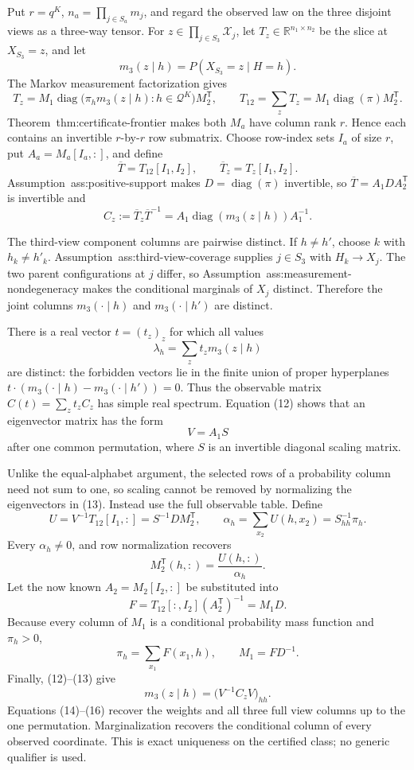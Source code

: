 Put \(r=q^K\), \(n_a=\prod_{j\in S_a}m_j\), and regard the observed law on the three disjoint views as a three-way tensor.  For \(z\in\prod_{j\in S_3}\mathcal X_j\), let \(T_z\in\mathbb R^{n_1\times n_2}\) be the slice at \(X_{S_3}=z\), and let
\[
 m_3(z\mid h)=P(X_{S_3}=z\mid H=h).
\]
The Markov measurement factorization gives
\[
 T_z=M_1\operatorname{diag}
 \bigl(\pi_hm_3(z\mid h):h\in\mathcal Q^K\bigr)M_2^{\mathsf T},
 \qquad
 T_{12}=\sum_zT_z=M_1\operatorname{diag}(\pi)M_2^{\mathsf T}.
\tag{11}
\]
Theorem~\textnormal{thm:certificate-frontier} makes both \(M_a\) have column rank \(r\).  Hence each contains an invertible \(r\)-by-\(r\) row submatrix.  Choose row-index sets \(I_a\) of size \(r\), put \(A_a=M_a[I_a,:]\), and define
\[
 \overline T=T_{12}[I_1,I_2],
 \qquad
 \overline T_z=T_z[I_1,I_2].
\]
Assumption~\textnormal{ass:positive-support} makes \(D=\operatorname{diag}(\pi)\) invertible, so \(\overline T=A_1DA_2^{\mathsf T}\) is invertible and
\[
 C_z:=\overline T_z\overline T^{-1}
 =A_1\operatorname{diag}(m_3(z\mid h))A_1^{-1}.
\tag{12}
\]

The third-view component columns are pairwise distinct.  If \(h\neq h'\), choose \(k\) with \(h_k\neq h'_k\).  Assumption~\textnormal{ass:third-view-coverage} supplies \(j\in S_3\) with \(H_k\to X_j\).  The two parent configurations at \(j\) differ, so Assumption~\textnormal{ass:measurement-nondegeneracy} makes the conditional marginals of \(X_j\) distinct.  Therefore the joint columns \(m_3(\cdot\mid h)\) and \(m_3(\cdot\mid h')\) are distinct.

There is a real vector \(t=(t_z)_z\) for which all values
\[
 \lambda_h=\sum_zt_zm_3(z\mid h)
\]
are distinct: the forbidden vectors lie in the finite union of proper hyperplanes \(t\cdot(m_3(\cdot\mid h)-m_3(\cdot\mid h'))=0\).  Thus the observable matrix \(C(t)=\sum_zt_zC_z\) has simple real spectrum.  Equation (12) shows that an eigenvector matrix has the form
\[
 V=A_1S
\tag{13}
\]
after one common permutation, where \(S\) is an invertible diagonal scaling matrix.

Unlike the equal-alphabet argument, the selected rows of a probability column need not sum to one, so scaling cannot be removed by normalizing the eigenvectors in (13).  Instead use the full observable table.  Define
\[
 U=V^{-1}T_{12}[I_1,:]
 =S^{-1}D M_2^{\mathsf T},
 \qquad
 \alpha_h=\sum_{x_2}U(h,x_2)=S_{hh}^{-1}\pi_h.
\]
Every \(\alpha_h\neq0\), and row normalization recovers
\[
 M_2^{\mathsf T}(h,:)=\frac{U(h,:)}{\alpha_h}.
\tag{14}
\]
Let the now known \(A_2=M_2[I_2,:]\) be substituted into
\[
 F=T_{12}[:,I_2](A_2^{\mathsf T})^{-1}=M_1D.
\]
Because every column of \(M_1\) is a conditional probability mass function and \(\pi_h>0\),
\[
 \pi_h=\sum_{x_1}F(x_1,h),
 \qquad
 M_1=F D^{-1}.
\tag{15}
\]
Finally, (12)--(13) give
\[
 m_3(z\mid h)=\bigl(V^{-1}C_zV\bigr)_{hh}.
\tag{16}
\]
Equations (14)--(16) recover the weights and all three full view columns up to the one permutation.  Marginalization recovers the conditional column of every observed coordinate.  This is exact uniqueness on the certified class; no generic qualifier is used.

